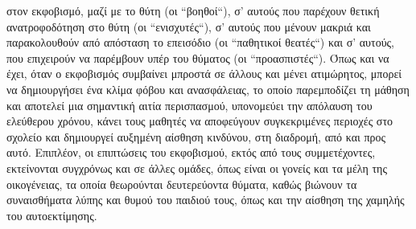 \documentclass[12pt,a4paper]{book}
\begin{document}
στον εκφοβισμό, μαζί με το θύτη (οι ``βοηθοί``), σ' αυτούς που παρέχουν θετική
ανατροφοδότηση στο θύτη (οι ``ενισχυτές``), σ' αυτούς που μένουν μακριά και
παρακολουθούν από απόσταση το επεισόδιο (οι ``παθητικοί θεατές``) και σ' αυτούς,
που επιχειρούν να παρέμβουν υπέρ του θύματος (οι ``προασπιστές``).
\newline\setlength{\parindent}{40pt}\indent Όπως και να έχει, όταν ο εκφοβισμός
συμβαίνει μπροστά σε άλλους και μένει ατιμώρητος, μπορεί να δημιουργήσει ένα
κλίμα φόβου και ανασφάλειας, το οποίο παρεμποδίζει τη μάθηση και αποτελεί μια
σημαντική αιτία περισπασμού, υπονομεύει την απόλαυση του ελεύθερου χρόνου, κάνει
τους μαθητές να αποφεύγουν συγκεκριμένες περιοχές στο σχολείο και δημιουργεί
αυξημένη αίσθηση κινδύνου, στη διαδρομή, από και προς αυτό.
\newline\setlength{\parindent}{40pt}\indent Επιπλέον, οι επιπτώσεις του
εκφοβισμού, εκτός από τους συμμετέχοντες, εκτείνονται συγχρόνως και σε άλλες
ομάδες, όπως είναι οι γονείς και τα μέλη της οικογένειας, τα οποία θεωρούνται
δευτερεύοντα θύματα, καθώς βιώνουν τα συναισθήματα λύπης και θυμού του παιδιού
τους, όπως και την αίσθηση της χαμηλής του αυτοεκτίμησης.
\end{document}
